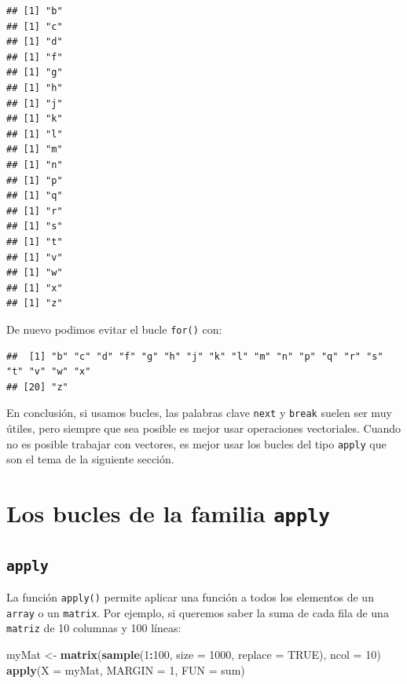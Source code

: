 \documentclass[
]{book}
\newenvironment{Shaded}{\begin{snugshade}}{\end{snugshade}}
\newcommand{\DataTypeTok}[1]{\textcolor[rgb]{0.13,0.29,0.53}{#1}}
\newcommand{\DecValTok}[1]{\textcolor[rgb]{0.00,0.00,0.81}{#1}}
\newcommand{\KeywordTok}[1]{\textcolor[rgb]{0.13,0.29,0.53}{\textbf{#1}}}
\newcommand{\NormalTok}[1]{#1}
\newcommand{\OperatorTok}[1]{\textcolor[rgb]{0.81,0.36,0.00}{\textbf{#1}}}
\newcommand{\OtherTok}[1]{\textcolor[rgb]{0.56,0.35,0.01}{#1}}
\newcommand{\StringTok}[1]{\textcolor[rgb]{0.31,0.60,0.02}{#1}}
\begin{document}
\begin{verbatim}
## [1] "b"
## [1] "c"
## [1] "d"
## [1] "f"
## [1] "g"
## [1] "h"
## [1] "j"
## [1] "k"
## [1] "l"
## [1] "m"
## [1] "n"
## [1] "p"
## [1] "q"
## [1] "r"
## [1] "s"
## [1] "t"
## [1] "v"
## [1] "w"
## [1] "x"
## [1] "z"
\end{verbatim}

De nuevo podimos evitar el bucle \texttt{for()} con:

\begin{Shaded}
\end{Shaded}

\begin{verbatim}
##  [1] "b" "c" "d" "f" "g" "h" "j" "k" "l" "m" "n" "p" "q" "r" "s" "t" "v" "w" "x"
## [20] "z"
\end{verbatim}

En conclusión, si usamos bucles, las palabras clave \texttt{next} y \texttt{break} suelen ser muy útiles, pero siempre que sea posible es mejor usar operaciones vectoriales. Cuando no es posible trabajar con vectores, es mejor usar los bucles del tipo \texttt{apply} que son el tema de la siguiente sección.

\hypertarget{l17applyfamily}{%
\section{\texorpdfstring{Los bucles de la familia \texttt{apply}}{Los bucles de la familia apply}}\label{l17applyfamily}}

\hypertarget{l17apply}{%
\subsection{\texorpdfstring{\texttt{apply}}{apply}}\label{l17apply}}

La función \texttt{apply()} permite aplicar una función a todos los elementos de un \texttt{array} o un \texttt{matrix}. Por ejemplo, si queremos saber la suma de cada fila de una \texttt{matriz} de 10 columnas y 100 líneas:

\begin{Shaded}
\begin{Highlighting}[]
\NormalTok{myMat <-}\StringTok{ }\KeywordTok{matrix}\NormalTok{(}\KeywordTok{sample}\NormalTok{(}\DecValTok{1}\OperatorTok{:}\DecValTok{100}\NormalTok{, }\DataTypeTok{size =} \DecValTok{1000}\NormalTok{, }\DataTypeTok{replace =} \OtherTok{TRUE}\NormalTok{), }\DataTypeTok{ncol =} \DecValTok{10}\NormalTok{)}
\KeywordTok{apply}\NormalTok{(}\DataTypeTok{X =}\NormalTok{ myMat, }\DataTypeTok{MARGIN =} \DecValTok{1}\NormalTok{, }\DataTypeTok{FUN =}\NormalTok{ sum)}
\end{Highlighting}
\end{Shaded}
\end{document}
